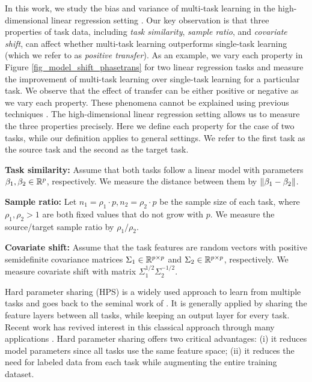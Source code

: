In this work, we study the bias and variance of multi-task learning in the high-dimensional linear regression setting \cite{HMRT19,BLLT20}.
Our key observation is that three properties of task data, including \textit{task similarity}, \textit{sample ratio}, and \textit{covariate shift}, can affect whether multi-task learning outperforms single-task learning (which we refer to as \textit{positive transfer}).
As an example, we vary each property in Figure \ref{fig_model_shift_phasetrans} for two linear regression tasks and measure the improvement of multi-task learning over single-task learning for a particular task.
We observe that the effect of transfer can be either positive or negative as we vary each property.
These phenomena cannot be explained using previous techniques \cite{WZR20}.
The high-dimensional linear regression setting allows us to measure the three properties precisely.
Here we define each property for the case of two tasks, while our definition applies to general settings.
We refer to the first task as the source task and the second as the target task.
\squishlist
	\item \textbf{Task similarity:} Assume that both tasks follow a linear model with parameters $\beta_1, \beta_2\in\mathbb{R}^p$, respectively.
	We measure the distance between them by $\|\beta_1 - \beta_2\|$.
	\item \textbf{Sample ratio:} Let $n_1 = \rho_1 \cdot p, n_2 = \rho_2 \cdot p$ be the sample size of each task, where $\rho_1, \rho_2>1$ are both fixed values that do not grow with $p$.
	We measure the source/target sample ratio by $\rho_1 / \rho_2$.
	\item \textbf{Covariate shift:} Assume that the task features are random vectors with positive semidefinite covariance matrices $\Sigma_1\in\mathbb{R}^{p\times p}$ and $\Sigma_2\in\mathbb{R}^{p\times p}$, respectively.
	We measure covariate shift with matrix $\Sigma_1^{1/2}\Sigma_2^{-1/2}$.
\squishend
\fi


Hard parameter sharing (HPS) is a widely used approach to learn from multiple tasks and goes back to the seminal work of \citet{C97}.
It is generally applied by sharing the feature layers between all tasks, while keeping an output layer for every task.
Recent work has revived interest in this classical approach through many applications \cite{MTDNN19,ZSSGM18}.
Hard parameter sharing offers two critical advantages:
(i) it reduces model parameters since all tasks use the same feature space;
(ii) it reduces the need for labeled data from each task while augmenting the entire training dataset.

